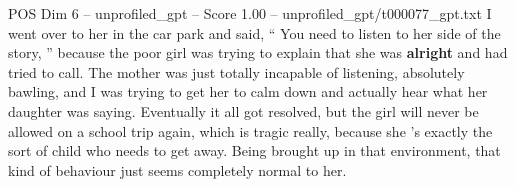 \begin{textsample}{POS Dim 6 – unprofiled\_gpt – Score 1.00 – unprofiled\_gpt/t000077\_gpt.txt}  \label{ex:f6_pos_022}
I went over to her in the car park and said, “ You need to listen to her side of the story, ” because the poor girl was trying to explain that she was \textbf{alright} and had tried to call.
The mother was just totally incapable of listening, absolutely bawling, and I was trying to get her to calm down and actually hear what her daughter was saying.
Eventually it all got resolved, but the girl will never be allowed on a school trip again, which is tragic really, because she ’s exactly the sort of child who needs to get away.
Being brought up in that environment, that kind of behaviour just seems completely normal to her.

\end{textsample}
